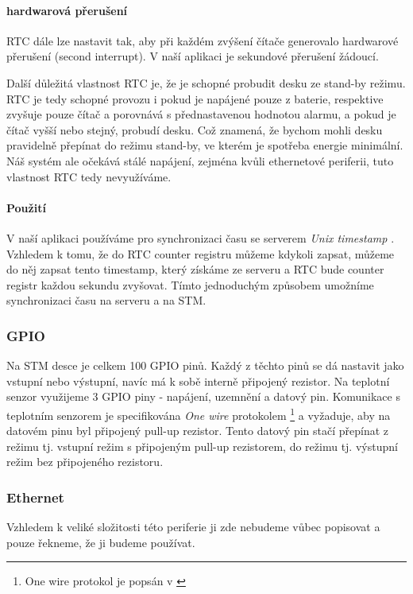 \paragraph{hardwarová přerušení}
RTC dále lze nastavit tak, aby při každém zvýšení čítače generovalo hardwarové
přerušení (second interrupt).
V naší aplikaci je sekundové přerušení žádoucí.

Další důležitá vlastnost RTC je, že je schopné probudit desku ze stand-by režimu.
RTC je tedy schopné provozu i pokud je napájené pouze z baterie, respektive
zvyšuje pouze čítač a porovnává s přednastavenou hodnotou alarmu, a pokud je
čítač vyšší nebo stejný, probudí desku.
Což znamená, že bychom mohli desku pravidelně přepínat do režimu stand-by, ve
kterém je spotřeba energie minimální.
Náš systém ale očekává stálé napájení, zejména kvůli ethernetové periferii,
tuto vlastnost RTC tedy nevyužíváme.

\paragraph{Použití}
V naší aplikaci používáme pro synchronizaci času se serverem \emph{Unix timestamp} \cite{Unix-timestamp}.
Vzhledem k tomu, že do RTC counter registru můžeme kdykoli zapsat, můžeme do něj zapsat tento timestamp, který
získáme ze serveru a RTC bude counter registr každou sekundu zvyšovat.
Tímto jednoduchým způsobem umožníme synchronizaci času na serveru a na STM.

\subsubsection{GPIO}
Na STM desce je celkem 100 GPIO pinů.
Každý z těchto pinů se dá nastavit jako vstupní nebo výstupní, navíc má k sobě interně připojený
rezistor.
Na teplotní senzor využijeme 3 GPIO piny - napájení, uzemnění a datový pin.
Komunikace s teplotním senzorem je specifikována \emph{One wire} protokolem
\footnote{One wire protokol je popsán v \cite{DS18B20}} a vyžaduje, aby na datovém pinu byl připojený pull-up rezistor.
Tento datový pin stačí přepínat z režimu  tj. vstupní režim s připojeným pull-up
rezistorem, do režimu  tj. výstupní režim bez připojeného rezistoru.

\subsubsection{Ethernet}
Vzhledem k veliké složitosti této periferie ji zde nebudeme vůbec popisovat a pouze řekneme, že ji
budeme používat.
